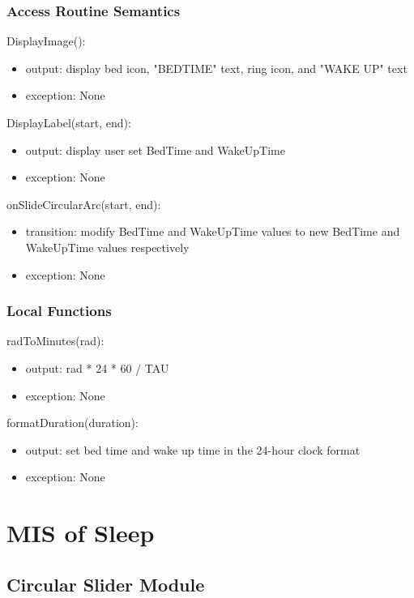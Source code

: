 \documentclass[12pt, titlepage]{article}
\begin{document}
\subsubsection{Access Routine Semantics}

\noindent DisplayImage():
\begin{itemize}
	\item output: display bed icon, "BEDTIME" text, ring icon, and "WAKE UP" text
	\item exception: None
\end{itemize}

\noindent DisplayLabel(start, end):
\begin{itemize}
	\item output: display user set BedTime and WakeUpTime
	\item exception: None
\end{itemize}

\noindent onSlideCircularArc(start, end):
\begin{itemize}
	\item transition: modify BedTime and WakeUpTime values to new BedTime and WakeUpTime values respectively
	\item exception: None
\end{itemize}

\subsubsection{Local Functions}

\noindent radToMinutes(rad):
\begin{itemize}
	\item output: rad * 24 * 60 / TAU
	\item exception: None 
\end{itemize}

\noindent formatDuration(duration):
\begin{itemize}
	\item output: set bed time and wake up time in the 24-hour clock format
	\item exception: None 
\end{itemize}

\section{MIS of Sleep} \label{Module} 

\subsection{Circular Slider Module}
\end{document}
